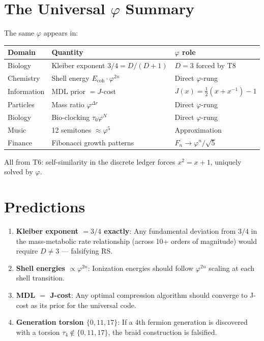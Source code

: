\documentclass[12pt,a4paper]{article}
\theoremstyle{definition}
\theoremstyle{remark}
\begin{document}
\section{The Universal $\varphi$ Summary}

The same $\varphi$ appears in:

\begin{center}
\begin{tabular}{lll}
\hline
Domain & Quantity & $\varphi$ role \\
\hline
Biology & Kleiber exponent $3/4 = D/(D+1)$ & $D = 3$ forced by T8 \\
Chemistry & Shell energy $E_\mathrm{coh} \cdot \varphi^{2n}$ & Direct $\varphi$-rung \\
Information & MDL prior $= J$-cost & $J(x) = \frac{1}{2}(x + x^{-1}) - 1$ \\
Particles & Mass ratio $\varphi^{\Delta r}$ & Direct $\varphi$-rung \\
Biology & Bio-clocking $\tau_0 \varphi^N$ & Direct $\varphi$-rung \\
Music & 12 semitones $\approx \varphi^5$ & Approximation \\
Finance & Fibonacci growth patterns & $F_n \to \varphi^n/\sqrt{5}$ \\
\hline
\end{tabular}
\end{center}

All from T6: self-similarity in the discrete ledger forces $x^2 = x + 1$, 
uniquely solved by $\varphi$.

\section{Predictions}

\begin{enumerate}
\item \textbf{Kleiber exponent $= 3/4$ exactly}: Any fundamental deviation from $3/4$ 
in the mass-metabolic rate relationship (across 10+ orders of magnitude) 
would require $D \neq 3$ — falsifying RS.

\item \textbf{Shell energies $\propto \varphi^{2n}$}: Ionization energies should 
follow $\varphi^{2n}$ scaling at each shell transition.

\item \textbf{MDL $=$ J-cost}: Any optimal compression algorithm should converge 
to J-cost as its prior for the universal code.

\item \textbf{Generation torsion $\{0, 11, 17\}$}: If a 4th fermion generation is 
discovered with a torsion $\tau_4 \notin \{0, 11, 17\}$, the braid construction is falsified.
\end{enumerate}
\end{document}
